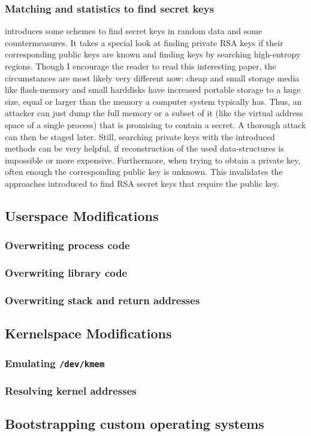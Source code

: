 \subsubsection{Matching and statistics to find secret keys}

\cite{hide_n_seek:1998} introduces some schemes to find secret keys in random
data and some countermeasures. It takes a special look at finding private RSA
keys if their corresponding public keys are known and finding keys by searching
high-entropy regions. Though I encourage the reader to read this interesting
paper, the circumstances are most likely very different now: cheap and small
storage media like flash-memory and small harddisks have increased portable
storage to a huge size, equal or larger than the memory a computer system
typically has. Thus, an attacker can just dump the full memory or a subset of it
(like the virtual address space of a single process) that is promising to
contain a secret. A thorough attack can then be staged later.  Still, searching
private keys with the introduced methods can be very helpful, if reconstruction
of the used data-structures is impossible or more expensive. Furthermore, when
trying to obtain a private key, often enough the corresponding public key is
unknown. This invalidates the approaches introduced to find RSA secret keys that
require the public key.




\subsection{Userspace Modifications}

\subsubsection{Overwriting process code}

\subsubsection{Overwriting library code}

\subsubsection{Overwriting stack and return addresses}




\subsection{Kernelspace Modifications}

\subsubsection{Emulating \texttt{/dev/kmem}}

\subsubsection{Resolving kernel addresses}





\subsection{Bootstrapping custom operating systems}



